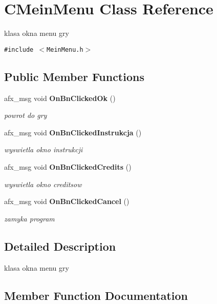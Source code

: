 \section{CMeinMenu Class Reference}
\label{class_c_mein_menu}
klasa okna menu gry  


{\tt \#include $<$MeinMenu.h$>$}

\subsection*{Public Member Functions}
\begin{CompactItemize}
\item 
afx\_\-msg void {\bf OnBnClickedOk} ()\label{class_c_mein_menu_c2cdc1905e9f60ce435856f688f7ed6c}

\begin{CompactList}\small\item\em powrot do gry \item\end{CompactList}\item 
afx\_\-msg void {\bf OnBnClickedInstrukcja} ()
\begin{CompactList}\small\item\em wyswietla okno instrukcji \item\end{CompactList}\item 
afx\_\-msg void {\bf OnBnClickedCredits} ()
\begin{CompactList}\small\item\em wyswietla okno creditsow \item\end{CompactList}\item 
afx\_\-msg void {\bf OnBnClickedCancel} ()\label{class_c_mein_menu_83e62773904b12ddb6133c7ab3092304}

\begin{CompactList}\small\item\em zamyka program \item\end{CompactList}\end{CompactItemize}


\subsection{Detailed Description}
klasa okna menu gry 



\subsection{Member Function Documentation}
